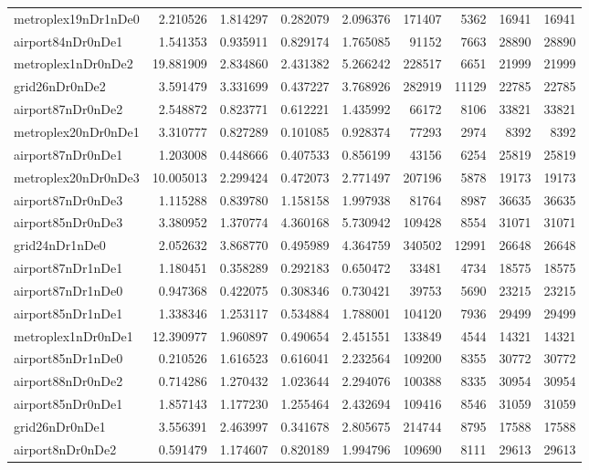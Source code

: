 \begin{longtable}{|l|r|r|r|r|r|r|r|r|}
metroplex19nDr1nDe0 & 2.210526 & 1.814297 & 0.282079 & 2.096376 & 171407 & 5362 & 16941 & 16941 \\
airport84nDr0nDe1 & 1.541353 & 0.935911 & 0.829174 & 1.765085 & 91152 & 7663 & 28890 & 28890 \\
metroplex1nDr0nDe2 & 19.881909 & 2.834860 & 2.431382 & 5.266242 & 228517 & 6651 & 21999 & 21999 \\
grid26nDr0nDe2 & 3.591479 & 3.331699 & 0.437227 & 3.768926 & 282919 & 11129 & 22785 & 22785 \\
airport87nDr0nDe2 & 2.548872 & 0.823771 & 0.612221 & 1.435992 & 66172 & 8106 & 33821 & 33821 \\
metroplex20nDr0nDe1 & 3.310777 & 0.827289 & 0.101085 & 0.928374 & 77293 & 2974 & 8392 & 8392 \\
airport87nDr0nDe1 & 1.203008 & 0.448666 & 0.407533 & 0.856199 & 43156 & 6254 & 25819 & 25819 \\
metroplex20nDr0nDe3 & 10.005013 & 2.299424 & 0.472073 & 2.771497 & 207196 & 5878 & 19173 & 19173 \\
airport87nDr0nDe3 & 1.115288 & 0.839780 & 1.158158 & 1.997938 & 81764 & 8987 & 36635 & 36635 \\
airport85nDr0nDe3 & 3.380952 & 1.370774 & 4.360168 & 5.730942 & 109428 & 8554 & 31071 & 31071 \\
grid24nDr1nDe0 & 2.052632 & 3.868770 & 0.495989 & 4.364759 & 340502 & 12991 & 26648 & 26648 \\
airport87nDr1nDe1 & 1.180451 & 0.358289 & 0.292183 & 0.650472 & 33481 & 4734 & 18575 & 18575 \\
airport87nDr1nDe0 & 0.947368 & 0.422075 & 0.308346 & 0.730421 & 39753 & 5690 & 23215 & 23215 \\
airport85nDr1nDe1 & 1.338346 & 1.253117 & 0.534884 & 1.788001 & 104120 & 7936 & 29499 & 29499 \\
metroplex1nDr0nDe1 & 12.390977 & 1.960897 & 0.490654 & 2.451551 & 133849 & 4544 & 14321 & 14321 \\
airport85nDr1nDe0 & 0.210526 & 1.616523 & 0.616041 & 2.232564 & 109200 & 8355 & 30772 & 30772 \\
airport88nDr0nDe2 & 0.714286 & 1.270432 & 1.023644 & 2.294076 & 100388 & 8335 & 30954 & 30954 \\
airport85nDr0nDe1 & 1.857143 & 1.177230 & 1.255464 & 2.432694 & 109416 & 8546 & 31059 & 31059 \\
grid26nDr0nDe1 & 3.556391 & 2.463997 & 0.341678 & 2.805675 & 214744 & 8795 & 17588 & 17588 \\
airport8nDr0nDe2 & 0.591479 & 1.174607 & 0.820189 & 1.994796 & 109690 & 8111 & 29613 & 29613 \\

\end{longtable}
